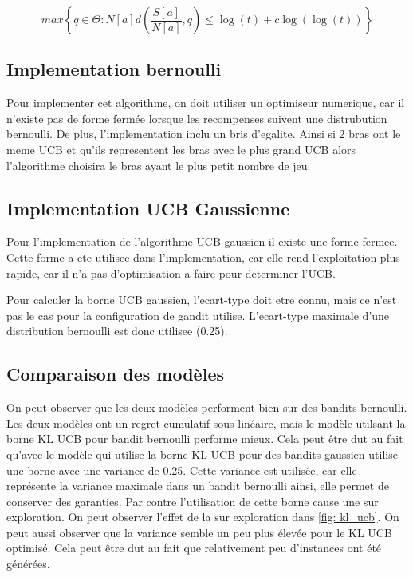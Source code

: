 \documentclass[letterpaper,11pt]{article}
\begin{document}
\begin{equation}
max \left\{ q \in \Theta : N[a] d\left(\frac{S[a]}{N[a]},q\right) \leq \log(t) + c \log(\log(t)) \right\}
\end{equation}\label{eq: ucb_bernoulli}

\subsection{Implementation bernoulli}

Pour implementer cet algorithme, on doit utiliser un optimiseur numerique, car il n'existe pas de forme fermée lorsque les recompenses suivent une distrubution bernoulli.
De plus, l'implementation inclu un bris d'egalite.
Ainsi si 2 bras ont le meme UCB et qu'ils representent les bras avec le plus grand UCB alors l'algorithme choisira le bras ayant le plus petit nombre de jeu.

\subsection{Implementation UCB Gaussienne}

Pour l'implementation de l'algorithme UCB gaussien il existe une forme fermee.
Cette forme a ete utilisee dans l'implementation, car elle rend l'exploitation plus rapide, car il n'a pas d'optimisation a faire pour determiner l'UCB.

Pour calculer la borne UCB gaussien, l'ecart-type doit etre connu, mais ce n'est pas le cas pour la configuration de gandit utilise.
L'ecart-type maximale d'une distribution bernoulli est donc utilisee (0.25).

\subsection{Comparaison des modèles}
On peut observer que les deux modèles performent bien sur des bandits bernoulli.
Les deux modèles ont un regret cumulatif sous linéaire, mais le modèle utilsant la borne KL UCB pour bandit bernoulli performe mieux.
Cela peut être dut au fait qu'avec le modèle qui utilise la borne KL UCB pour des bandits gaussien utilise une borne avec une variance de 0.25.
Cette variance est utilisée, car elle représente la variance maximale dans un bandit bernoulli ainsi, elle permet de conserver des garanties.
Par contre l'utilisation de cette borne cause une sur exploration.
On peut observer l'effet de la sur exploration dans \ref{fig: kl_ucb}.
On peut aussi observer que la variance semble un peu plus élevée pour le KL UCB optimisé.
Cela peut être dut au fait que relativement peu d'instances ont été générées.
\end{document}
